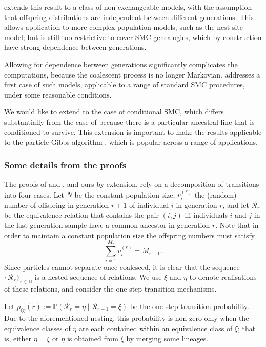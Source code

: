\documentclass{article}
\newcommand{\PR}{\mathbb{P}}
\begin{document}
\citet{mohle1998} extends this result to a class of non-exchangeable models, with the assumption that offspring distributions are independent between different generations. This allows application to more complex population models, such as the nest site model; but is still too restrictive to cover SMC genealogies, which by construction have strong dependence between generations.

Allowing for dependence between generations significantly complicates the computations, because the coalescent process is no longer Markovian. \citet{koskela2018} addresses a first case of such models, applicable to a range of standard SMC procedures, under some reasonable conditions.

We would like to extend to the case of conditional SMC, which differs substantially from the case of \citet{koskela2018} because there is a particular ancestral line that is conditioned to survive. This extension is important to make the results applicable to the particle Gibbs algorithm \citep{andrieu2010}, which is popular across a range of applications.

\subsubsection{Some details from the proofs}
The proofs of \citet{mohle1998} and \citet{koskela2018}, and ours by extension, rely on a decomposition of transitions into four cases.
Let $N$ be the constant population size, $v_i^{(r)}$ the (random) number of offspring in generation $r+1$ of individual $i$ in generation $r$, and let $\mathcal{R}_r$ be the equivalence relation that contains the pair $(i,j)$ iff individuals $i$ and $j$ in the last-generation sample have a common ancestor in generation $r$. 
Note that in order to maintain a constant population size the offspring numbers must satisfy
\begin{equation}\label{eq:sum_vi}
\sum_{i=1}^{M_r} v_i^{(r)} = M_{r-1}.
\end{equation}
Since particles cannot separate once coalesced, it is clear that the sequence $\{\mathcal{R}_r\}_{r \in \mathbb{N}}$ is a nested sequence of relations.
We use $\xi$ and $\eta$ to denote realisations of these relations, and consider the one-step transition mechanisms.

Let $p_{\xi\eta}(r) := \PR(\mathcal{R}_r=\eta\mid\mathcal{R}_{r-1}=\xi)$ be the one-step transition probability. Due to the aforementioned nesting, this probability is non-zero only when the equivalence classes of $\eta$ are each contained within an equivalence class of $\xi$; that is, either $\eta=\xi$ or $\eta$ is obtained from $\xi$ by merging some lineages.
\end{document}

